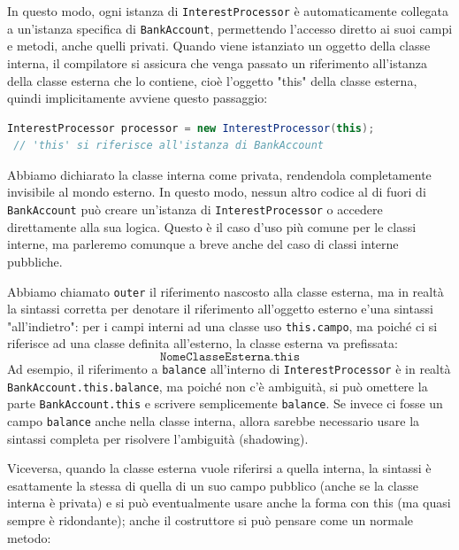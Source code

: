 In questo modo, ogni istanza di \texttt{InterestProcessor} è automaticamente collegata a un'istanza specifica di \texttt{BankAccount}, permettendo l'accesso diretto ai suoi campi e metodi, anche quelli privati. Quando viene istanziato un oggetto della classe interna, il compilatore si assicura che venga passato un riferimento all'istanza della classe esterna che lo contiene, cioè l'oggetto "this" della classe esterna, quindi implicitamente avviene questo passaggio:

\begin{lstlisting}[language=Java, caption={Creazione di un'istanza della classe interna}]
InterestProcessor processor = new InterestProcessor(this);
 // 'this' si riferisce all'istanza di BankAccount
\end{lstlisting}

\begin{observation}
    Abbiamo dichiarato la classe interna come privata, rendendola completamente invisibile al mondo esterno. In questo modo, nessun altro codice al di fuori di \texttt{BankAccount} può creare un'istanza di \texttt{InterestProcessor} o accedere direttamente alla sua logica. Questo è il caso d'uso più comune per le classi interne, ma parleremo comunque a breve anche del caso di classi interne pubbliche.
\end{observation}

Abbiamo chiamato \texttt{outer} il riferimento nascosto alla classe esterna, ma in realtà la sintassi corretta per denotare il riferimento all'oggetto esterno e'una sintassi "all'indietro": per i campi interni ad una classe uso \texttt{this.campo}, ma poiché ci si riferisce ad una classe definita all'esterno, la classe esterna va prefissata:
\[ \texttt{NomeClasseEsterna.this} \]
Ad esempio, il riferimento a \texttt{balance} all'interno di \texttt{InterestProcessor} è in realtà \texttt{BankAccount.this.balance}, ma poiché non c'è ambiguità, si può omettere la parte \texttt{BankAccount.this} e scrivere semplicemente \texttt{balance}. Se invece ci fosse un campo \texttt{balance} anche nella classe interna, allora sarebbe necessario usare la sintassi completa per risolvere l'ambiguità (shadowing).

Viceversa, quando la classe esterna vuole riferirsi a quella interna, la sintassi è esattamente la stessa di quella di un suo campo pubblico (anche se la classe interna è privata) e si può eventualmente usare anche la forma con this (ma quasi sempre è ridondante); anche il costruttore si può pensare come un normale metodo:

